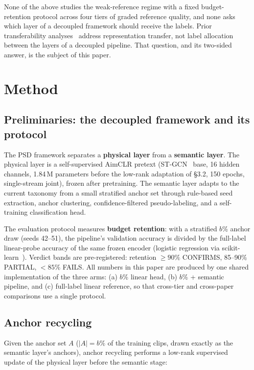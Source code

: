 \documentclass[preprint,12pt,number]{elsarticle}
\begin{document}
None of the above studies the weak-reference regime with a fixed
budget-retention protocol across four tiers of graded reference quality, and
none asks which layer of a decoupled framework should receive the labels.
Prior transferability analyses~\cite{yosinski,transfer_survey} address representation transfer, not
label allocation between the layers of a decoupled pipeline. That question,
and its two-sided answer, is the subject of this paper.

\section{Method}

\subsection{Preliminaries: the decoupled framework and its protocol}

The PSD framework separates a \textbf{physical layer} from a \textbf{semantic layer}.
The physical layer is a self-supervised AimCLR pretext (ST-GCN~\cite{stgcn} base, 16
hidden channels, 1.84\,M parameters before the low-rank adaptation of \S3.2,
150 epochs, single-stream joint), frozen
after pretraining. The semantic layer adapts to the current taxonomy from a
small stratified anchor set through rule-based seed extraction, anchor
clustering, confidence-filtered pseudo-labeling, and a self-training
classification head.

The evaluation protocol measures \textbf{budget retention}: with a stratified
$b$\% anchor draw (seeds 42--51), the pipeline's validation accuracy is divided
by the full-label linear-probe accuracy of the same frozen encoder (logistic
regression via scikit-learn~\cite{sklearn}). Verdict
bands are pre-registered: retention $\ge 90\%$ CONFIRMS, 85--90\% PARTIAL, $<85\%$
FAILS. All numbers in this paper are produced by one shared implementation of
the three arms: (a) $b$\% linear head, (b) $b$\% + semantic pipeline, and (c)
full-label linear reference, so that cross-tier and cross-paper comparisons
use a single protocol.

\subsection{Anchor recycling}

Given the anchor set $A$ ($|A| = b\%$ of the training clips, drawn exactly as
the semantic layer's anchors), anchor recycling performs a low-rank
supervised update of the physical layer before the semantic stage:
\end{document}
